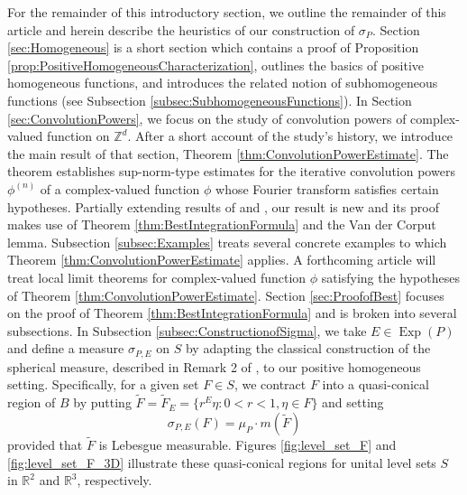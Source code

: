 \documentclass[11pt]{article}
\theoremstyle{remark}
\newcommand\Exp{\operatorname{Exp}}
\begin{document}
\noindent For the remainder of this introductory section, we outline the remainder of this article and herein describe the heuristics of our construction of $\sigma_P$. Section \ref{sec:Homogeneous} is a short section which contains a proof of Proposition \ref{prop:PositiveHomogeneousCharacterization}, outlines the basics of positive homogeneous functions, and introduces the related notion of subhomogeneous functions (see Subsection \ref{subsec:SubhomogeneousFunctions}). In Section \ref{sec:ConvolutionPowers}, we focus on the study of convolution powers of complex-valued function on $\mathbb{Z}^d$. After a short account of the study's history, we introduce the main result of that section, Theorem \ref{thm:ConvolutionPowerEstimate}. The theorem establishes sup-norm-type estimates for the iterative convolution powers $\phi^{(n)}$ of a complex-valued function $\phi$ whose Fourier transform satisfies certain hypotheses. Partially extending results of \cite{randles_convolution_2015} and \cite{randles_convolution_2017}, our result is new and its proof makes use of Theorem \ref{thm:BestIntegrationFormula} and the Van der Corput lemma. Subsection \ref{subsec:Examples} treats several concrete examples to which Theorem \ref{thm:ConvolutionPowerEstimate} applies. A forthcoming article will treat local limit theorems for complex-valued function $\phi$ satisfying the hypotheses of Theorem \ref{thm:ConvolutionPowerEstimate}. Section \ref{sec:ProofofBest} focuses on the proof of Theorem \ref{thm:BestIntegrationFormula} and is broken into several subsections. In Subsection \ref{subsec:ConstructionofSigma}, we take $E\in\Exp(P)$ and define a measure $\sigma_{P,E}$ on $S$ by adapting the classical construction of the spherical measure, described in Remark 2 of \cite{folland_how_2001}, to our positive homogeneous setting. Specifically, for a given set $F\in S$, we contract $F$ into a quasi-conical region of $B$ by putting $\widetilde{F}=\widetilde{F}_E=\{r^E\eta:0<r<1,\eta\in F\}$
and setting
\begin{equation*}
\sigma_{P,E}(F)=\mu_P \cdot m(\widetilde{F})
\end{equation*}
provided that $\widetilde{F}$ is Lebesgue measurable. Figures \ref{fig:level_set_F} and \ref{fig:level_set_F_3D} illustrate these quasi-conical regions for unital level sets $S$ in $\mathbb{R}^2$ and $\mathbb{R}^3$, respectively.
\end{document}
